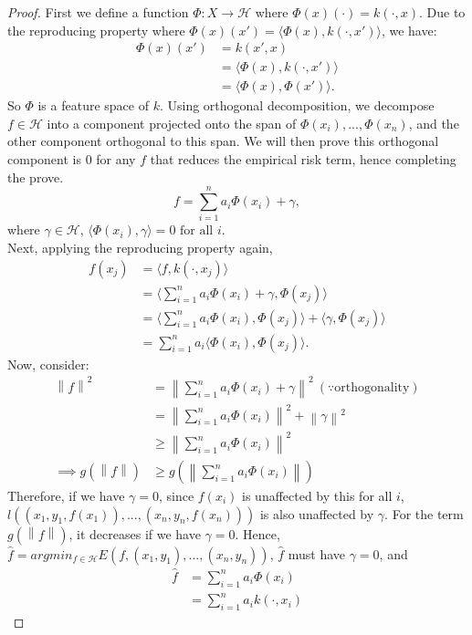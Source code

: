 \documentclass[english]{article}
\newcommand\norm[1]{\left\lVert#1\right\rVert}
\newcommand\inner[1]{\langle#1\rangle}
\begin{document}
\begin{proof}
	First we define a function $\Phi: X \rightarrow \mathcal{H}$ where $\Phi(x)(\cdot) = k(\cdot , x)$. Due to the reproducing property where $\Phi(x)(x') = \inner{\Phi(x), k(\cdot, x')}$, we have:
	\begin{equation*}
	\begin{split}
		\Phi(x)(x') &= k(x', x) \\
			&= \inner{\Phi(x), k(\cdot, x')} \\
			&= \inner{\Phi(x), \Phi(x')}. 
	\end{split}
	\end{equation*}
	So $\Phi$ is a feature space of $k$. Using orthogonal decomposition, we decompose $f \in \mathcal{H}$ into a component projected onto the span of ${\Phi(x_i), ..., \Phi(x_n)}$, and the other component orthogonal to this span. We will then prove this orthogonal component is $0$ for any $f$ that reduces the empirical risk  term, hence completing the prove.
	\[ f = \sum_{i=1}^{n} a_i \Phi(x_i) + \gamma, \]
	where $\gamma \in \mathcal{H}$, $\inner{\Phi(x_i), \gamma} = 0 \text{ for all } i$.\\
	Next, applying the reproducing property again,
	\begin{equation*}
	\begin{split}
	f(x_j) &= \inner{f, k(\cdot, x_j)} \\
	&= \inner{\sum_{i=1}^{n} a_i \Phi(x_i) + \gamma, \Phi(x_j)} \\
	&= \inner{\sum_{i=1}^{n} a_i \Phi(x_i),  \Phi(x_j)} + \inner{\gamma,  \Phi(x_j)} \\
	&= \sum_{i=1}^{n} a_i \inner{\Phi(x_i),  \Phi(x_j)}.
	\end{split}
	\end{equation*}
	Now, consider:
	\begin{equation*}
	\begin{split}
	\norm{f}^2 &= \norm{\sum_{i=1}^{n} a_i \Phi(x_i) + \gamma}^2 ~ (\because \text{orthogonality})\\
	&=  \norm{\sum_{i=1}^{n} a_i \Phi(x_i)}^2 + \norm{\gamma}^2 \\
	&\geq \norm{\sum_{i=1}^{n} a_i \Phi(x_i)}^2 \\
	\implies g(\norm{f}) &\geq g(\norm{\sum_{i=1}^{n} a_i \Phi(x_i)})
	\end{split}
	\end{equation*}
	Therefore, if we have $\gamma = 0$, since $f(x_i)$ is unaffected by this for all $i$, 
	$l((x_1, y_1, f(x_1)), ..., (x_n, y_n, f(x_n)))$ is also unaffected by $\gamma$. For the term $g(\norm{f})$, it decreases if we have $\gamma = 0$. Hence,  $\hat{f} = argmin_{f \in \mathcal{H}} E(f, (x_1, y_1), ..., (x_n, y_n))$, $\hat{f}$ must have $\gamma = 0$, and 
	\begin{equation*}
	\begin{split}
	\hat{f} &= \sum_{i=1}^{n} a_i \Phi(x_i) \\
		&=  \sum_{i=1}^{n} a_i k(\cdot, x_i)
	\end{split}
	\end{equation*}
\end{proof}
\end{document}
